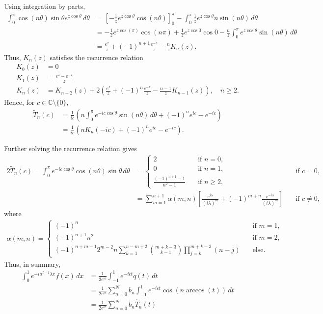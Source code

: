 \documentclass[11pt, oneside, a4paper]{article}
\begin{document}
Using integration by parts,
\begin{align*}
\int_0^{\pi}\cos(n\theta)\sin\theta e^{z\cos\theta}\,d\theta &= \left[-\frac{1}{z}e^{z\cos\theta}\cos(n\theta)\right]_0^{\pi} - \int_0^{\pi}\frac{1}{z}e^{z\cos\theta}n\sin(n\theta)\,d\theta\\
&= -\frac{1}{z}e^{z\cos(\pi)}\cos(n\pi) + \frac{1}{z}e^{z\cos 0}\cos 0 - \frac{n}{z}\int_0^{\pi}e^{z\cos\theta}\sin(n\theta)\,d\theta\\
&= \frac{e^z}{z} + (-1)^{n+1}\frac{e^{-z}}{z} - \frac{n}{z}K_n(z).
\end{align*}
Thus, $K_n(z)$ satisfies the recurrence relation
\begin{align*}
K_0(z) &= 0\\
K_1(z) &= \frac{e^z-e^{-z}}{z}\\
K_{n}(z) &= K_{n-2}(z) + 2\left(\frac{e^z}{z} + (-1)^{n}\frac{e^{-z}}{z} - \frac{n-1}{z}K_{n-1}(z)\right),\quad n\geq 2.
\end{align*}
Hence, for $c\in\mathbb{C}\setminus\{0\}$,
\begin{align*}
\tilde{T}_n(c) &= \frac{1}{ic}\left(n\int_0^{\pi}e^{-ic\cos\theta}\sin(n\theta)\,d\theta + (-1)^n e^{ic}- e^{-ic}\right)\\
&= \frac{1}{ic}\left(nK_n(-ic) + (-1)^n e^{ic} - e^{-ic}\right).
\end{align*}

Further solving the recurrence relation \cite{Fokas2012} gives
\begin{alignat*}{2}
    \tilde{T}_n(c) = \int_0^\pi e^{-ic\cos\theta}\cos(n\theta)\sin\theta\,d\theta &= 
    \begin{cases}
        2 &\quad\mbox{if $n=0$},\\
        0 &\quad\mbox{if $n=1$},\\
        \frac{(-1)^{n+1}-1}{n^2-1} &\quad\mbox{if $n\geq 2$},
    \end{cases}
    &\quad\mbox{if $c=0$},\\
    &= \sum_{m=1}^{n+1}\alpha(m,n)\left[\frac{e^{i\lambda}}{(i\lambda)^m} + (-1)^{m+n}\frac{e^{-i\lambda}}{(i\lambda)^m}\right]&\quad\mbox{if $c\neq 0$},
\end{alignat*}
where
\begin{align*}
\alpha(m,n) =
\begin{cases}
(-1)^n&\quad\mbox{if $m=1$},\\
(-1)^{n+1}n^2&\quad\mbox{if $m=2$},\\
(-1)^{n+m-1}2^{m-2}n\sum_{k=1}^{n-m+2}\binom{m+k-3}{k-1}\prod_{j=k}^{m+k-3}(n-j)&\quad\mbox{else}.
\end{cases}
\end{align*}
Thus, in summary,
\begin{align*}
    \int_0^1 e^{-i\alpha^{l-1}\lambda x}f(x)\,dx &= \frac{1}{2e^{ic}}\int_{-1}^1 e^{-ict} q(t)\,dt\\
    &= \frac{1}{2e^{ic}}\sum_{n=0}^N b_n \int_{-1}^1 e^{-ict}\cos(n \arccos(t))\,dt\\
    &= \frac{1}{2e^{ic}}\sum_{n=0}^N b_n \hat{T}_n(t)
\end{align*}
\end{document}
